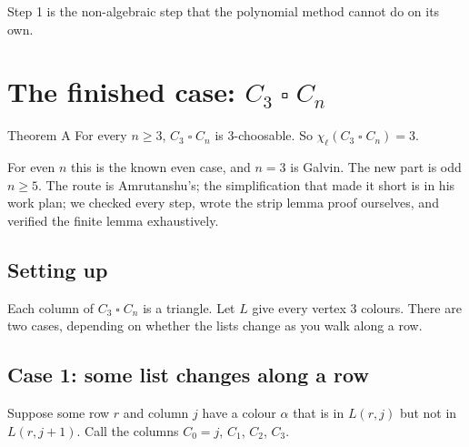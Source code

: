 \documentclass[11pt,oneside,openany]{book}
\newcommand{\T}{\mathbin{\square}}
\begin{document}
Step 1 is the non-algebraic step that the polynomial method cannot do on its own.

\chapter{The finished case: $C_3 \T C_n$}

\begin{proved}{Theorem A}
For every $n \ge 3$, $C_3 \T C_n$ is 3-choosable. So $\chi_\ell(C_3 \T C_n) = 3$.
\end{proved}

For even $n$ this is the known even case, and $n=3$ is Galvin. The new part is odd $n \ge 5$.
The route is Amrutanshu's; the simplification that made it short is in his work plan; we checked
every step, wrote the strip lemma proof ourselves, and verified the finite lemma exhaustively.

\section{Setting up}

Each column of $C_3 \T C_n$ is a triangle. Let $L$ give every vertex 3 colours. There are two cases,
depending on whether the lists change as you walk along a row.

\section{Case 1: some list changes along a row}

Suppose some row $r$ and column $j$ have a colour $\alpha$ that is in $L(r,j)$ but not in
$L(r,j+1)$. Call the columns $C_0 = j$, $C_1$, $C_2$, $C_3$.

\begin{center}
\end{center}
\end{document}
